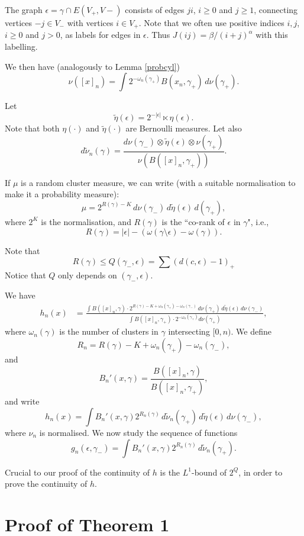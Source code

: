 \documentclass[11pt, a4paper]{amsart}
\theoremstyle{definition}
\theoremstyle{remark}
\renewcommand{\d}{\,d}
\providecommand{\e}{\epsilon}
\providecommand{\g}{\gamma}
\providecommand{\w}{\omega}
\begin{document}
The graph
$\e=\g\cap E(V_+,V-)$ consists of edges $ji$, $i\ge0$ and $j\ge 1$, connecting vertices
$-j\in V_-$ with vertices $i\in V_+$. Note that we often use positive indices $i,j$,
$i\ge0$ and $j>0$, as labels for edges in $\e$. Thus $J(ij)=\beta/(i+j)^\alpha$ with this
labelling.

We then have (analogously to Lemma \ref{probcyl})
 \[
    \nu([x]_n) =  \int 2^{-\w_n(\g_+)} B(x_n,\g_+) \d\nu(\g_+).
     \]


Let
$$ \tilde \eta(\epsilon)= 2^{-|\epsilon|} \ltimes \eta (\epsilon). $$
Note that both $\eta(\cdot)$ and $\tilde\eta (\cdot)$ are Bernoulli measures. Let also
$$ d\tilde \nu_n(\gamma) = \frac{d\nu(\gamma_-)\otimes \tilde \eta(\epsilon)\otimes \nu(\gamma_+)}{\nu(B([x]_n,\gamma_+))}. $$

If $\mu$ is a random cluster measure, we can write (with a suitable normalisation to make it a probability measure):
$$\mu= 2^{R(\g)-K} \d\nu(\g_-)\d\tilde \eta(\epsilon) \d(\g_+),$$
where $2^K$ is the normalisation, and $R(\g)$ is the ``co-rank of $\epsilon$ in $\g$", i.e.,
$$R(\g)=|\epsilon|-(\omega(\g \setminus \epsilon)-\omega(\g)).$$

Note that
$$ R(\g) \le Q(\g_-,\e) =\sum \left(d(c,\epsilon)-1\right)_+$$
Notice that $Q$ only depends on $(\gamma_-,\epsilon)$. 

We have
\begin{align}
  h_n(x) &= 
  \frac{\int B([x]_n, \g) \cdot 2^{R(\g)-K+\omega_n(\g_+)-\omega_n(\g_-)}
  \d\nu(\g_+)\d \tilde \eta(\e)\d\nu(\g_-)}
  {\int B([x]_n,\g_+) \cdot 2^{-\omega_n(\g_+)} d\nu(\g_+)},
\end{align}
where 
$\omega_n(\g)$ is the number of clusters in $\g$ intersecting $[0,n)$. We define 
$$R_n=R(\g)-K+\omega_n(\g_+)-\omega_n(\g_-),$$ and 
$$B_n'(x,\g)=\frac{B([x]_n, \g)}{B([x]_n,\g_+)},$$
and write
$$ h_n(x) = \int B_n'(x,\g) 2^{R_n(\g)}\d\tilde \nu_n(\g_+)\d \tilde \eta(\e)\d\nu(\g_-),$$
where $\nu_n$ is normalised. We now study the sequence of functions 
$$g_n(\epsilon, \g_-)=\int B_n'(x,\g) 2^{R_n(\g)}\d\tilde \nu_n(\g_+).$$

Crucial to our proof of the continuity of $h$ is the $L^1$-bound of $2^Q$, in order to prove the continuity of $h$.

\section{Proof of Theorem 1}\noindent
\end{document}
